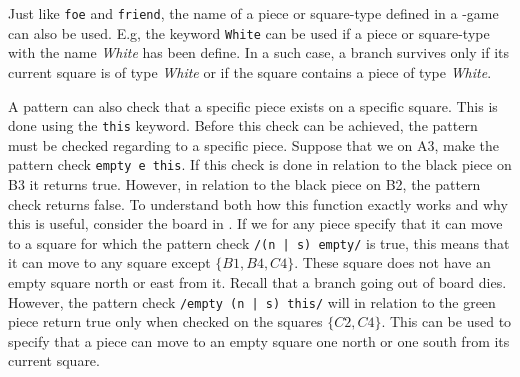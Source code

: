 Just like \texttt{foe} and \texttt{friend}, the name of a piece or square-type defined in a \productname{}-game can also be used. E.g, the keyword \texttt{White} can be used if a piece or square-type with the name \textit{White} has been define. In a such case, a branch survives only if its current square is of type \textit{White} or if the square contains a piece of type \textit{White}.

A pattern can also check that a specific piece exists on a specific square. This is done using the \texttt{this} keyword.
Before this check can be achieved, the pattern must be checked regarding to a specific piece. Suppose that we on A3, make the pattern check
\texttt{empty e this}. If this check is done in relation to the black piece on B3 it returns true. However, in relation to the black piece on B2, the pattern check returns false. To understand both how this function exactly works and why this is useful, consider the board in .
If we for any piece specify that it can move to a square for which the pattern check \texttt{/(n | s) empty/} is true, this means that it can move to any square except $\{B1, B4, C4\}$. These square does not have an empty square north or east from it. Recall that a branch going out of board dies.
However, the pattern check \texttt{/empty (n | s) this/} will in relation to the green piece return true only when checked on the squares $\{C2, C4\}$.
This can be used to specify that a piece can move to an empty square one north or one south from its current square. 